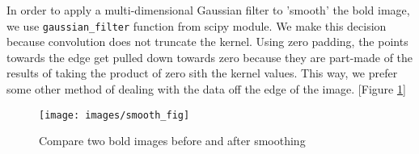 \par \indent In order to apply a multi-dimensional Gaussian filter to 'smooth'
the bold image, we use \texttt{gaussian\_filter} function from scipy module. 
We make this decision because convolution does not truncate the kernel. Using
zero padding, the points towards the edge get pulled down towards zero because
they are part-made of the results of taking the product of zero sith the kernel
values. This way, we prefer some other method of dealing with the data off the
edge of the image. [Figure \ref{fig:smoothing}]
 
\begin{figure}[!ht]
\centering
\texttt{[image: images/smooth\_fig]}
\caption{Compare two bold images before and after smoothing}
\label{fig:smoothing}
\end{figure}
